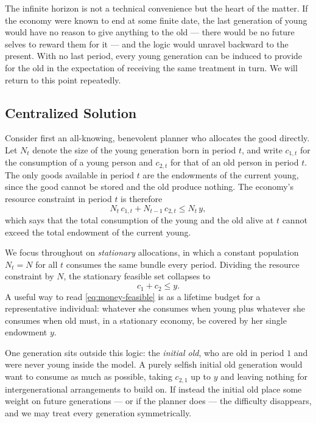 The infinite horizon is not a technical convenience but the heart of the matter. If the economy were known to end at some finite date, the last generation of young would have no reason to give anything to the old --- there would be no future selves to reward them for it --- and the logic would unravel backward to the present. With no last period, every young generation can be induced to provide for the old in the expectation of receiving the same treatment in turn. We will return to this point repeatedly.

\subsection{Centralized Solution}

Consider first an all-knowing, benevolent planner who allocates the good directly. Let $N_t$ denote the size of the young generation born in period $t$, and write $c_{1,t}$ for the consumption of a young person and $c_{2,t}$ for that of an old person in period $t$. The only goods available in period $t$ are the endowments of the current young, since the good cannot be stored and the old produce nothing. The economy's resource constraint in period $t$ is therefore
\[
N_t\, c_{1,t} + N_{t-1}\, c_{2,t} \le N_t\, y,
\]
which says that the total consumption of the young and the old alive at $t$ cannot exceed the total endowment of the current young.

We focus throughout on \emph{stationary} allocations, in which a constant population $N_t = N$ for all $t$ consumes the same bundle every period. Dividing the resource constraint by $N$, the stationary feasible set collapses to
\begin{equation}
c_1 + c_2 \le y.
\label{eq:money-feasible}
\end{equation}
A useful way to read \eqref{eq:money-feasible} is as a lifetime budget for a representative individual: whatever she consumes when young plus whatever she consumes when old must, in a stationary economy, be covered by her single endowment $y$.

One generation sits outside this logic: the \emph{initial old}, who are old in period $1$ and were never young inside the model. A purely selfish initial old generation would want to consume as much as possible, taking $c_{2,1}$ up to $y$ and leaving nothing for intergenerational arrangements to build on. If instead the initial old place some weight on future generations --- or if the planner does --- the difficulty disappears, and we may treat every generation symmetrically.

